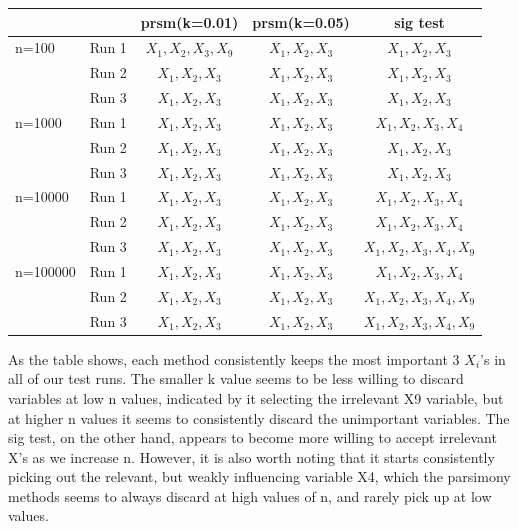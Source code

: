 \documentclass[letter]{article}
\begin{document}
\begin{tabular}{| l  r | c | c | c |}

\hline

	&&	prsm(k=0.01)&	prsm(k=0.05)&	sig test	\\
\hline

n=100&	Run 1&	$X_1 ,X_2, X_3, X_9$&	$X_1, X_2, X_3$&		$X_1, X_2, X_3$	\\
	&	Run 2&	$X_1, X_2, X_3$&		$X_1, X_2, X_3$&		$X_1, X_2, X_3$	\\
	&	Run 3&	$X_1, X_2, X_3$&		$X_1, X_2, X_3$&		$X_1, X_2, X_3$	\\

\hline

n=1000&	Run 1&	$X_1, X_2, X_3$&		$X_1, X_2, X_3$&		$X_1, X_2, X_3, X_4$	\\
	&	Run 2&	$X_1, X_2, X_3$&		$X_1, X_2, X_3$&		$X_1, X_2, X_3$		\\
	&	Run 3&	$X_1, X_2, X_3$&		$X_1, X_2, X_3$&		$X_1, X_2, X_3$		\\
	
\hline
			
n=10000&	Run 1&	$X_1, X_2, X_3$&		$X_1, X_2, X_3$&		$X_1, X_2, X_3, X_4$		\\
	&	Run 2&	$X_1, X_2, X_3$&		$X_1, X_2, X_3$&		$X_1, X_2, X_3, X_4$		\\
	&	Run 3&	$X_1, X_2, X_3$&		$X_1, X_2, X_3$&		$X_1, X_2, X_3, X_4, X_9$		\\

\hline
			
n=100000&	Run 1&	$X_1, X_2, X_3$&		$X_1, X_2, X_3$&		$X_1, X_2, X_3, X_4$		\\
	&	Run 2&	$X_1, X_2, X_3$&		$X_1, X_2, X_3$&		$X_1, X_2, X_3, X_4, X_9$		\\
	&	Run 3&	$X_1, X_2, X_3$&		$X_1, X_2, X_3$&		$X_1, X_2, X_3, X_4, X_9$		\\

\hline

\end{tabular}


As the table shows, each method consistently keeps the most important 3 $X_i$'s in all of our test runs. The smaller k value seems to be less willing to discard variables at low n values, indicated by it selecting the irrelevant X9 variable, but at higher n values it seems to consistently discard the unimportant variables. The sig test, on the other hand, appears to become more willing to accept irrelevant X's as we increase n. However, it is also worth noting that it starts consistently picking out the relevant, but weakly influencing variable X4, which the parsimony methods seems to always discard at high values of n, and rarely pick up at low values.
\end{document}
